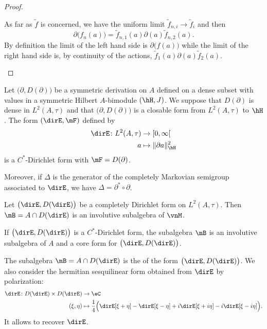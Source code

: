 \begin{proof}
\begin{enumerate}
            As far as \( \tilde f\) is concerned, we have the uniform limit \( \tilde f_{n,i}\to\tilde f_i\) and then
            \begin{equation}
                \partial\big( f_n(a) \big)=\tilde f_{n,1}(a)\partial(a)\tilde f_{n,2}(a).
            \end{equation}
            By definition the limit of the left hand side is \( \partial\big( f(a) \big)\) while the limit of the right hand side is, by continuity of the actions, \( \tilde f_1(a)\partial(a)\tilde f_2(a)\).

    \end{enumerate}

\end{proof}

\begin{theorem}
	Let $\big( \partial,D(\partial) \big)$ be a symmetric derivation on $A$ defined on a dense subset with values in a symmetric Hilbert $A$-bimodule $(\hH,J)$. We suppose that $D(\partial)$ is dense in $L^2(A,\tau)$ and that $\big( \partial,D(\partial) \big)$ is a closable form from $L^2(A,\tau)$ to $\hH$. The form $(\dirE,\mF)$ defined by
	\begin{equation}
		\begin{aligned}
			\dirE\colon L^2(A,\tau)&\to \mathopen[ 0 , \infty [ \\
			a&\mapsto \| \partial a \|^2_{\hH}
		\end{aligned}
	\end{equation}
	is  a $C^*$-Dirichlet form with $\mF=D(\partial)$.

	Moreover, if $\Delta$ is the generator of the completely Markovian semigroup associated to $\dirE$, we have $\Delta=\partial^*\circ \partial$.
\end{theorem}

\begin{proposition}
	Let $\big( \dirE,D(\dirE) \big)$ be a completely Dirichlet form on $L^2(A,\tau)$. Then $\mB=A\cap D(\dirE)$ is an involutive subalgebra of $\vnM$.

	If $\big( \dirE,D(\dirE) \big)$ is a $C^*$-Dirichlet form, the subalgebra $\mB$ is an involutive subalgebra of $A$ and a core form for $\big( \dirE,D(\dirE) \big)$.
\end{proposition}

The subalgebra $\mB=A\cap D(\dirE)$ is the  of the form $\big( \dirE,D(\dirE) \big)$. We also consider the hermitian sesquilinear form obtained from \(\dirE\) by polarization:
\begin{equation}
    \begin{aligned}
        \dirE\colon D(\dirE)\times D(\dirE)&\to \eC \\
        (\xi,\eta)&\mapsto \frac{1}{ 4 }\Big( \dirE[\xi+\eta]-\dirE[\xi-\eta]+i\dirE[\xi+i\eta]-i\dirE[\xi-i\eta]  \Big).
    \end{aligned}
\end{equation}
It allows to recover \(\dirE\).

